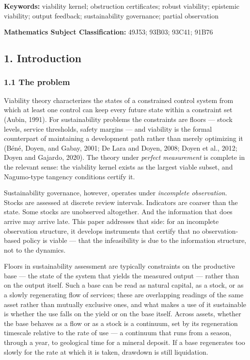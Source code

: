 \documentclass[10pt,twocolumn]{article}
\theoremstyle{definition}
\begin{document}
\textbf{Keywords:} viability kernel; obstruction certificates; robust
viability; epistemic viability; output feedback; sustainability
governance; partial observation

\textbf{Mathematics Subject Classification:} 49J53; 93B03; 93C41; 91B76

\subsection{1. Introduction}\label{calc-introduction}

\subsubsection{1.1 The problem}\label{calc-the-problem}

Viability theory characterizes the states of a constrained control system from which at least one control can keep every future state within a constraint set (Aubin, 1991). For sustainability problems the constraints are floors --- stock levels, service thresholds, safety margins --- and viability is the formal counterpart of maintaining a development path rather than merely optimizing it (B\'en\'e, Doyen, and Gabay, 2001; De Lara and Doyen, 2008;
Doyen et al., 2012; Doyen and Gajardo, 2020). The theory under
\emph{perfect measurement} is complete in the relevant sense: the
viability kernel exists as the largest viable subset, and Nagumo-type
tangency conditions certify it.

Sustainability governance, however, operates under \emph{incomplete
observation}. Stocks are assessed at discrete review intervals.
Indicators are coarser than the state. Some stocks are unobserved
altogether. And the information that does arrive may arrive late. This paper addresses that side: for an incomplete observation structure, it develops instruments that certify that no observation-based policy is viable --- that the infeasibility is due to the information structure, not to the dynamics.

Floors in sustainability assessment are typically constraints on the
productive base --- the state of the system that yields the measured
output --- rather than on the output itself. Such a base can be read as
natural capital, as a stock, or as a slowly regenerating flow of
services; these are overlapping readings of the same asset rather than
mutually exclusive ones, and what makes a use of it sustainable is
whether the use falls on the yield or on the base itself. Across
assets, whether the base behaves as a flow or as a stock is a
continuum, set by its regeneration timescale relative to the rate of
use --- a continuum that runs from a season, through a year, to
geological time for a mineral deposit. If a base regenerates too
slowly for the rate at which it is taken, drawdown is still
liquidation.
\end{document}

